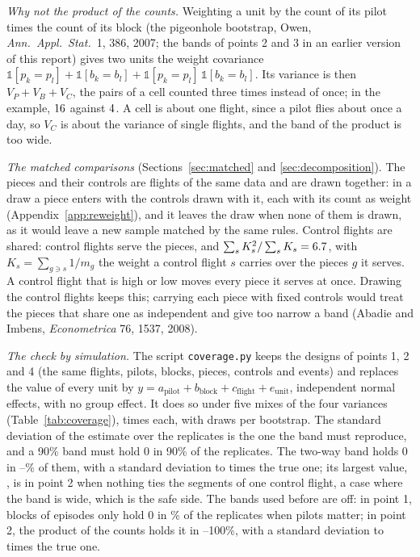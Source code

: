 \emph{Why not the product of the counts.} Weighting a unit by the count of its pilot times the count of its block (the pigeonhole bootstrap, Owen, \emph{Ann.\ Appl.\ Stat.}\ 1, 386, 2007; the bands of points 2 and 3 in an earlier version of this report) gives two units the weight covariance $\mathbb 1[p_k=p_l]+\mathbb 1[b_k=b_l]+\mathbb 1[p_k=p_l]\,\mathbb 1[b_k=b_l]$.
Its variance is then $V_P+V_B+V_C$, the pairs of a cell counted three times instead of once; in the example, $16$ against $4$. A cell is about one flight, since a pilot flies about once a day, so $V_C$ is about the variance of single flights, and the band of the product is too wide.

\emph{The matched comparisons} (Sections~\ref{sec:matched} and \ref{sec:decomposition}). The pieces and their controls are flights of the same data and are drawn together: in a draw a piece enters with the controls drawn with it, each with its count as weight (Appendix~\ref{app:reweight}), and it leaves the draw when none of them is drawn, as it would leave a new sample matched by the same rules.
Control flights are shared: \MatNGPoolFlights{} control flights serve the \MatNGPieces{} pieces, and $\sum_sK_s^2/\sum_sK_s=6.7$, with $K_s=\sum_{g\ni s}1/m_g$ the weight a control flight $s$ carries over the pieces $g$ it serves. A control flight that is high or low moves every piece it serves at once.
Drawing the control flights keeps this; carrying each piece with fixed controls would treat the pieces that share one as independent and give too narrow a band (Abadie and Imbens, \emph{Econometrica} 76, 1537, 2008).

\emph{The check by simulation.} The script \texttt{coverage.py} keeps the designs of points 1, 2 and 4 (the same flights, pilots, blocks, pieces, controls and events) and replaces the value of every unit by $y=a_\text{pilot}+b_\text{block}+c_\text{flight}+e_\text{unit}$, independent normal effects, with no group effect. It does so under five mixes of the four variances (Table~\ref{tab:coverage}), \CovReplicates{} times each, with \CovDraws{} draws per bootstrap.
The standard deviation of the estimate over the replicates is the one the band must reproduce, and a 90\% band must hold 0 in 90\% of the replicates. The two-way band holds 0 in \CovNewMin--\CovNewMax\% of them, with a standard deviation \CovNewSdMin{} to \CovNewSdMax{} times the true one; its largest value, \CovNewSdMax, is in point 2 when nothing ties the segments of one control flight, a case where the band is wide, which is the safe side.
The bands used before are off: in point 1, blocks of episodes only hold 0 in \CovOldRawMin\% of the replicates when pilots matter; in point 2, the product of the counts holds it in \CovOldMatchedMin--100\%, with a standard deviation \CovOldMatchedSdMin{} to \CovOldMatchedSdMax{} times the true one.

